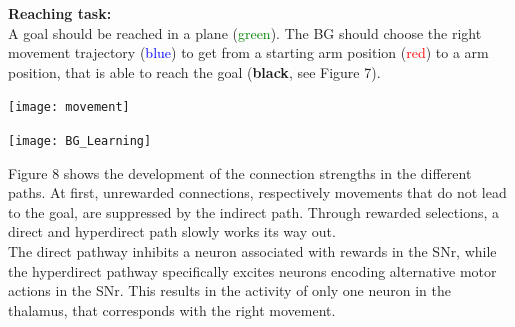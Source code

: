 \documentclass[portrait,final,a0paper,fontscale=0.33]{baposter}
\begin{document}
\begin{poster}
{	\begin{adjustbox}{minipage=0.95\textwidth, margin=5pt, center}
		
		\begin{minipage}[l]{0.37\textwidth}
			\textbf{Reaching task:} \\
			
			A goal should be reached in a plane (\textcolor{green}{green}). The BG should choose the right movement trajectory (\textcolor{blue}{blue}) to get from a starting arm position (\textcolor{red}{red}) to a arm position, that is able to reach the goal (\textbf{black}, see Figure 7).
			
			\vspace{3pt}
			
			\texttt{[image: movement]}
			
			\vfill
		\end{minipage}
		\hfill
		\begin{minipage}[r]{0.65\textwidth}
			\vspace{30pt}
			\texttt{[image: BG\_Learning]}
		\end{minipage}
		
		\vspace{1pt}
			
		\begin{minipage}[b]{\textwidth}
			\begin{multicols}{2}
			Figure 8 shows the development of the connection strengths in the different paths.
			At first, unrewarded connections, respectively movements that do not lead to the goal, are suppressed by the indirect path. Through rewarded selections, a direct and hyperdirect path slowly works its way out.\\
			The direct pathway inhibits a neuron associated with rewards in the SNr, while the hyperdirect pathway specifically excites neurons encoding alternative motor actions in the SNr. This results in the activity of only one neuron in the thalamus, that corresponds with the right movement.
			\end{multicols}
		\end{minipage}
	
	\end{adjustbox}

}


\end{poster}
\end{document}

